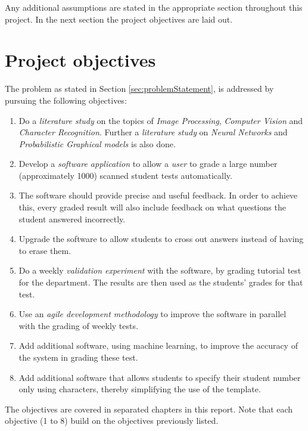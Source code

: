 Any additional assumptions are stated in the appropriate section throughout this project. In the next section the project objectives are laid out.


\section{Project objectives}
\label{sec:Objectives}

The problem as stated in Section \ref{sec:problemStatement}, is addressed by pursuing the following objectives:
\begin{enumerate}
  \item Do a \textsl{literature study} on the topics of \textsl{Image Processing}, \textsl{Computer Vision} and \textsl{Character Recognition}. Further a \textsl{literature study} on \textsl{Neural Networks} and \textsl{Probabilistic Graphical models} is also done.
  \item Develop a \textsl{software application} to allow a \textsl{user} to grade a large number (approximately 1000) scanned student tests automatically.
\item The software should provide precise and useful feedback. In order to achieve this, every graded result will also include feedback on what questions the student answered incorrectly.
\item Upgrade the software to allow students to cross out answers instead of having to erase them.
  \item Do a weekly \textsl{validation experiment} with the software, by grading tutorial test for the department. The results are then used as the students' grades for that test.
  \item Use an \textsl{agile development methodology} to improve the software in parallel with the grading of weekly tests.
  \item Add additional software, using machine learning, to improve the accuracy of the system in grading these test.
  \item Add additional software that allows students to specify their student number only using characters, thereby simplifying the use of the template.
\end{enumerate}

The objectives are covered in separated chapters in this report. Note that each objective (1 to 8) build on the objectives previously listed.


